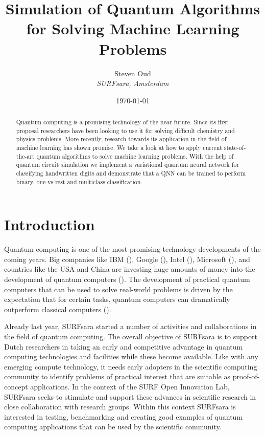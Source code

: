 \documentclass[a4paper,10pt]{article}
\title{Simulation of Quantum Algorithms for Solving Machine Learning Problems}
\author{Steven Oud \\ \emph{SURFsara, Amsterdam}}
\date{\today}
\begin{document}
\maketitle

\begin{abstract}
Quantum computing is a promising technology of the near future.
Since its first proposal researchers have been looking to use it for solving difficult chemistry and physics problems.
More recently, research towards its application in the field of machine learning has shown promise.
We take a look at how to apply current state-of-the-art quantum algorithms to solve machine learning problems.
With the help of quantum circuit simulation we implement a variational quantum neural network for classifying handwritten digits and demonstrate that a QNN can be trained to perform binary, one-vs-rest and multiclass classification.
\end{abstract}

\tableofcontents

\clearpage

\section{Introduction}
Quantum computing is one of the most promising technology developments of the coming years.
Big companies like IBM (\cite{ibm-quantum}), Google (\cite{google-quantum}), Intel (\cite{intel-quantum}), Microsoft (\cite{microsoft-quantum}), and countries like the USA and China are investing huge amounts of money into the development of quantum computers (\cite{usa-quantum, china-quantum}).
The development of practical quantum computers that can be used to solve real-world problems is driven by the expectation that for certain tasks, quantum computers can dramatically outperform classical computers (\cite{preskill-qc}).

Already last year, SURFsara started a number of activities and collaborations in the field of quantum computing.
The overall objective of SURFsara is to support Dutch researchers in taking an early and competitive advantage in quantum computing technologies and facilities while these become available.
Like with any emerging compute technology, it needs early adopters in the scientific computing community to identify problems of practical interest that are suitable as proof-of-concept applications.
In the context of the SURF Open Innovation Lab, SURFsara seeks to stimulate and support these advances in scientific research in close collaboration with research groups.
Within this context SURFsara is interested in testing, benchmarking and creating good examples of quantum computing applications that can be used by the scientific community.
\end{document}
